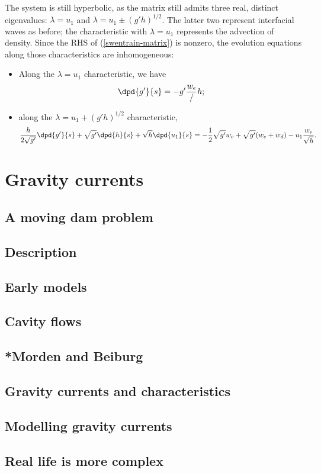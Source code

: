 The system is still hyperbolic, as the matrix still admits three real, distinct eigenvalues: $\lambda = u_1$ and $\lambda = u_1 \pm (g'h)^{1/2}$. The latter two represent interfacial waves as before; the characteristic with $\lambda = u_1$ represents the advection of density. Since the RHS of (\ref{swentrain-matrix}) is nonzero, the evolution equations along those characteristics are inhomogeneous:
\begin{itemize}
	\item Along the $\lambda = u_1$ characteristic, we have
	\begin{equation}
		\dpd{g'}{s} = -g' \frac{w_e}/h;
	\end{equation}
	\item along the $\lambda = u_1 + (g'h)^{1/2}$ characteristic,
	\begin{equation}
		\frac{h}{2\sqrt{g'}} \dpd{g'}{s} + \sqrt{g'} \dpd{h}{s} + \sqrt{h} \dpd{u_1}{s}
		 = -\frac{1}{2}\sqrt{g'} w_e + \sqrt{g'} (w_e + w_d) - u_1 \frac{w_e}{\sqrt{h}}.
	\end{equation}
\end{itemize}


\section{Gravity currents}
\subsection{A moving dam problem}
\subsection{Description}
\subsection{Early models}
\subsection{Cavity flows}
\subsection{*Morden and Beiburg}
\subsection{Gravity currents and characteristics}
\subsection{Modelling gravity currents}
\subsection{Real life is more complex}
